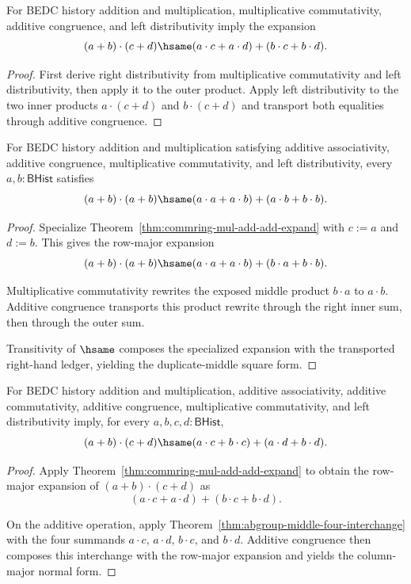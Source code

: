 \begin{theorem}
\label{thm:commring-mul-add-add-expand}
For BEDC history addition and multiplication, multiplicative commutativity,
additive congruence, and left distributivity imply the expansion
$$
(a+b)\cdot(c+d)\hsame
(a\cdot c+a\cdot d)+(b\cdot c+b\cdot d).
$$
\end{theorem}
\begin{proof}
First derive right distributivity from multiplicative commutativity and left
distributivity, then apply it to the outer product. Apply left distributivity
to the two inner products $a\cdot(c+d)$ and $b\cdot(c+d)$ and transport both
equalities through additive congruence.
\end{proof}

\begin{theorem}
\label{thm:commring-square-of-sum-duplicate-middle}
For BEDC history addition and multiplication satisfying additive
associativity, additive congruence, multiplicative commutativity, and left
distributivity, every $a,b : \mathsf{BHist}$ satisfies
$$
(a+b)\cdot(a+b)\hsame
(a\cdot a+a\cdot b)+(a\cdot b+b\cdot b).
$$
\end{theorem}
\begin{proof}
Specialize Theorem~\ref{thm:commring-mul-add-add-expand} with $c:=a$ and
$d:=b$. This gives the row-major expansion
$$
(a+b)\cdot(a+b)\hsame
(a\cdot a+a\cdot b)+(b\cdot a+b\cdot b).
$$

Multiplicative commutativity rewrites the exposed middle product
$b\cdot a$ to $a\cdot b$. Additive congruence transports this product rewrite
through the right inner sum, then through the outer sum.

Transitivity of $\hsame$ composes the specialized expansion with the
transported right-hand ledger, yielding the duplicate-middle square form.
\end{proof}

\begin{theorem}
\label{thm:commring-mul-add-add-column-expand}
For BEDC history addition and multiplication, additive associativity,
additive commutativity, additive congruence, multiplicative commutativity,
and left distributivity imply, for every $a,b,c,d : \mathsf{BHist}$,
$$
(a+b)\cdot(c+d)\hsame
(a\cdot c+b\cdot c)+(a\cdot d+b\cdot d).
$$
\end{theorem}
\begin{proof}
Apply Theorem~\ref{thm:commring-mul-add-add-expand} to obtain the row-major
expansion of $(a+b)\cdot(c+d)$ as
$$
(a\cdot c+a\cdot d)+(b\cdot c+b\cdot d).
$$

On the additive operation, apply
Theorem~\ref{thm:abgroup-middle-four-interchange} with the four summands
$a\cdot c$, $a\cdot d$, $b\cdot c$, and $b\cdot d$. Additive congruence then
composes this interchange with the row-major expansion and yields the
column-major normal form.
\end{proof}

